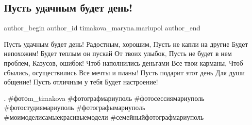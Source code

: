  
 
 
 
 

\subsection{Пусть удачным будет день!}
\label{sec:17_01_2021.fb.timakova_maryna.mariupol.1.pust_udachnym_budet_den}

\ifcmt
 author_begin
   author_id timakova_maryna.mariupol
 author_end
\fi

\obeycr
Пусть удачным будет день!
Радостным, хорошим,
Пусть не капли на другие
Будет непохожим!
Будет теплым он пускай
От твоих улыбок,
Пусть не будет в нем проблем,
Казусов, ошибок!
Чтоб наполнились деньгами
Все твои карманы,
Чтоб сбылись, осуществились
Все мечты и планы!
Пусть подарит этот день
Для души общение!
Пусть отличным у тебя
Будет настроение!
\restorecr

.  \#фотоm\_timakova \#фотографмариуполь \#фотосессиямариуполь \#фотостудиямариуполь
\#фотографымариуполь \#моимоделисамыекрасивыемодели \#семейныйфотографмариуполь
